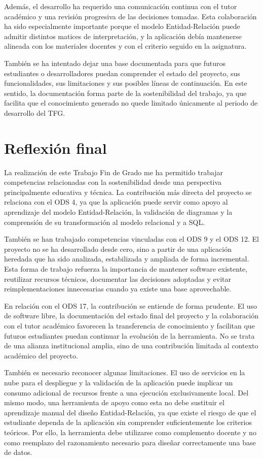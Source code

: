 Además, el desarrollo ha requerido una comunicación continua con el tutor académico y una revisión progresiva de las decisiones tomadas. Esta colaboración ha sido especialmente importante porque el modelo Entidad-Relación puede admitir distintos matices de interpretación, y la aplicación debía mantenerse alineada con los materiales docentes y con el criterio seguido en la asignatura.

También se ha intentado dejar una base documentada para que futuros estudiantes o desarrolladores puedan comprender el estado del proyecto, sus funcionalidades, sus limitaciones y sus posibles líneas de continuación. En este sentido, la documentación forma parte de la sostenibilidad del trabajo, ya que facilita que el conocimiento generado no quede limitado únicamente al periodo de desarrollo del TFG.

\section{Reflexión final}

La realización de este Trabajo Fin de Grado me ha permitido trabajar competencias relacionadas con la sostenibilidad desde una perspectiva principalmente educativa y técnica. La contribución más directa del proyecto se relaciona con el ODS 4, ya que la aplicación puede servir como apoyo al aprendizaje del modelo Entidad-Relación, la validación de diagramas y la comprensión de su transformación al modelo relacional y a SQL.

También se han trabajado competencias vinculadas con el ODS 9 y el ODS 12. El proyecto no se ha desarrollado desde cero, sino a partir de una aplicación heredada que ha sido analizada, estabilizada y ampliada de forma incremental. Esta forma de trabajo refuerza la importancia de mantener software existente, reutilizar recursos técnicos, documentar las decisiones adoptadas y evitar reimplementaciones innecesarias cuando ya existe una base aprovechable.

En relación con el ODS 17, la contribución se entiende de forma prudente. El uso de software libre, la documentación del estado final del proyecto y la colaboración con el tutor académico favorecen la transferencia de conocimiento y facilitan que futuros estudiantes puedan continuar la evolución de la herramienta. No se trata de una alianza institucional amplia, sino de una contribución limitada al contexto académico del proyecto.

También es necesario reconocer algunas limitaciones. El uso de servicios en la nube para el despliegue y la validación de la aplicación puede implicar un consumo adicional de recursos frente a una ejecución exclusivamente local. Del mismo modo, una herramienta de apoyo como esta no debe sustituir el aprendizaje manual del diseño Entidad-Relación, ya que existe el riesgo de que el estudiante dependa de la aplicación sin comprender suficientemente los criterios teóricos. Por ello, la herramienta debe utilizarse como complemento docente y no como reemplazo del razonamiento necesario para diseñar correctamente una base de datos.

